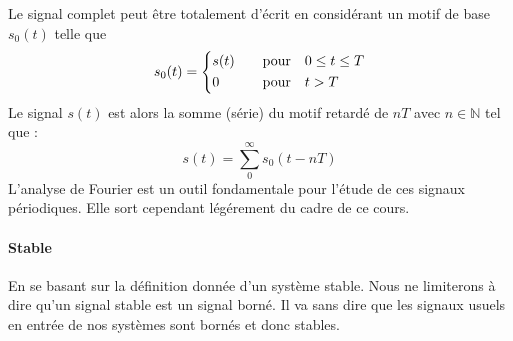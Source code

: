 Le signal complet peut être totalement d'écrit en considérant un motif de base $s_0(t)$ telle que
\begin{align*}
s_0(t) =
\begin{dcases}
    s(t)&\quad\text{pour}\quad 0\le t\le T   \\
    0&\quad\text{pour}\quad t>T
\end{dcases}
\end{align*}
Le signal $s(t)$ est alors la somme (série) du motif retardé de $nT$ 
avec $n\in\mathbb{N}$ tel que :
$$
s(t)=\sum_0^\infty s_0(t-nT)
$$
L'analyse de Fourier est un outil fondamentale pour l'étude 
de ces signaux périodiques. Elle sort cependant légérement du cadre de ce cours.

\paragraph{Stable}
En se basant sur la définition donnée d'un système stable.
Nous ne limiterons à dire qu'un signal stable est un signal 
borné. Il va sans dire que les signaux usuels en entrée
de nos systèmes sont bornés et donc stables.

